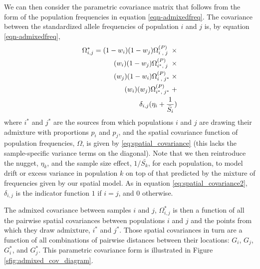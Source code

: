 \documentclass[12pt]{article}
\newcommand{\kadmixsource}[1]{{$G^{*}_{#1}$}}
\newcommand{\identifyadmixsource}[1]{{#1^{*}}}
\begin{document}
We can then consider the parametric covariance matrix that follows from the form of the population frequencies in equation \eqref{eqn-admixedfreq}. The covariance between the standardized allele frequencies of population $i$ and $j$ is, by equation \eqref{eqn-admixedfreq},
\begin{alignat}{3}
\label{eq:admixed_covariance_1}
\identifyadmixsource{\Omega_{i,j}} = (1-w_i)(1-w_j) \Omega^{(P)}_{i\;,\;j\;} \; \times&\\
(w_i)(1-w_j) \Omega^{(P)}_{\identifyadmixsource{i},\;j\;} \; \times   \notag&\\
(w_j)(1-w_i) \Omega^{(P)}_{i\;,\;\identifyadmixsource{j}} \; \times   \notag&\\
(w_i)(w_j) \Omega^{(P)}_{\identifyadmixsource{i},\;\identifyadmixsource{j}} \; +   \notag&\\
\delta_{i,j} (\eta_i + \frac{1}{\bar{S}_i}) \notag&
\end{alignat}
where $\identifyadmixsource{i}$ and $\identifyadmixsource{j}$ are the sources from which populations $i$ and $j$ are drawing their admixture with proportions $p_i$ and $p_j$, and the spatial covariance function of population frequencies, $\Omega$, is given by \eqref{eq:spatial_covariance} (this lacks the sample-specific variance terms on the diagonal). Note that we then reintroduce the nugget, $\eta_k$, and the sample size effect, $1/\bar{S_k}$, for each population, to model drift or excess variance in population $k$ on top of that predicted by the mixture of frequencies given by our spatial model.  As in equation \eqref{eq:spatial_covariance2}, $\delta_{i,j} $ is the indicator function $1$ if $i=j$, and $0$ otherwise. 


The admixed covariance between samples $i$ and $j$, $\identifyadmixsource{\Omega_{i,j}}$ is then a function of all the pairwise spatial covariances between populations $i$ and $j$ and the points from which they draw admixture, $\identifyadmixsource{i}$ and $\identifyadmixsource{j}$.  Those spatial covariances in turn are a function of all combinations of pairwise distances between their locations: $G_i$, $G_j$, \kadmixsource{i}, and \kadmixsource{j}.  This parametric covariance form is illustrated in Figure \ref{sfig:admixed_cov_diagram}.
\end{document}
